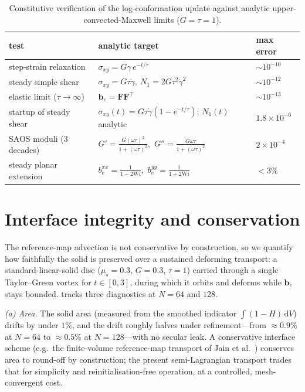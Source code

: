 \documentclass[final,3p,times]{elsarticle}
\newcommand{\be}{\bm{b}_e}
\newcommand{\Ften}{\bm{F}}
\begin{document}
\begin{table}[t]\centering\small
\caption{Constitutive verification of the log-conformation update against analytic
upper-convected-Maxwell limits ($G=\tau=1$).}
\label{tab:constitutive}
\begin{tabular}{@{}lll@{}}
\toprule
test & analytic target & max error \\
\midrule
step-strain relaxation & $\sigma_{xy}=G\gamma\,e^{-t/\tau}$ & ${\sim}10^{-10}$ \\
steady simple shear & $\sigma_{xy}=G\tau\dot\gamma,\ N_1=2G\tau^2\dot\gamma^2$ & ${\sim}10^{-12}$ \\
elastic limit ($\tau\!\to\!\infty$) & $\be=\Ften\Ften^{\!\top}$ & ${\sim}10^{-13}$ \\
startup of steady shear & $\sigma_{xy}(t)=G\tau\dot\gamma(1-e^{-t/\tau})$; $N_1(t)$ analytic & $1.8\times10^{-6}$ \\
SAOS moduli (3 decades) & $G'=\tfrac{G(\omega\tau)^2}{1+(\omega\tau)^2}$,\ $G''=\tfrac{G\omega\tau}{1+(\omega\tau)^2}$ & $2\times10^{-4}$ \\
steady planar extension & $b_e^{xx}=\tfrac{1}{1-2\mathrm{Wi}}$,\ $b_e^{yy}=\tfrac{1}{1+2\mathrm{Wi}}$ & ${<}3\%$ \\
\bottomrule
\end{tabular}
\end{table}

\section{Interface integrity and conservation}
\label{sec:supp-drift}
The reference-map advection is not conservative by construction, so we quantify how faithfully the
solid is preserved over a sustained deforming transport: a standard-linear-solid disc
($\mu_s=0.3$, $G=0.3$, $\tau=1$) carried through a single Taylor--Green vortex for $t\in[0,3]$,
during which it orbits and deforms while $\be$ stays bounded.  tracks three
diagnostics at $N{=}64$ and $128$.

\emph{(a) Area.} The solid area (measured from the smoothed indicator $\int(1-H)\,\mathrm{d}V$)
drifts by under $1\%$, and the drift roughly halves under refinement---from ${\approx}0.9\%$ at
$N{=}64$ to ${\approx}0.5\%$ at $N{=}128$---with no secular leak. A conservative interface scheme
(e.g.\ the finite-volume reference-map transport of Jain et al.\ \cite{Jain2019}) conserves
area to round-off by construction; the present semi-Lagrangian transport trades that for
simplicity and reinitialisation-free operation, at a controlled, mesh-convergent cost.
\end{document}

